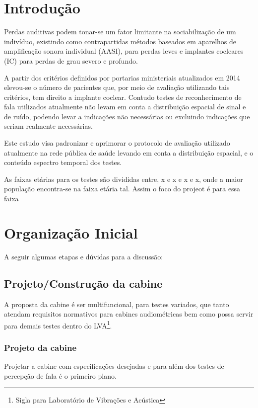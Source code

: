 \chapter{Introdução}

Perdas auditivas podem tonar-se um fator limitante na sociabilização de um indivíduo, existindo como contrapartidas métodos baseados em aparelhos de amplificação sonora individual (AASI), para perdas leves e implantes cocleares (IC) para perdas de grau severo e profundo.

A partir dos critérios definidos por portarias ministeriais atualizados em 2014 elevou-se o número de pacientes que, por meio de avaliação utilizando tais critérios, tem direito a implante coclear. Contudo testes de reconhecimento de fala utilizados atualmente não levam em conta a distribuição espacial de sinal e de ruído, podendo levar a indicações não necessárias ou excluindo indicações que seriam realmente necessárias.

Este estudo visa padronizar e aprimorar o protocolo de avaliação utilizado atualmente na rede pública de saúde levando em conta a distribuição espacial, e o conteúdo espectro temporal dos testes. 

As faixas etárias para os testes são divididas entre, x e x e x e x, onde a maior população encontra-se na faixa etária tal. Assim o foco do projeot é para essa faixa

\chapter{Organização Inicial}
A seguir algumas etapas e dúvidas para a discussão:

\section{Projeto/Construção da cabine}

A proposta da cabine é ser multifuncional, para testes variados, que tanto atendam requisitos normativos para cabines audiométricas bem como possa servir para demais testes dentro do LVA\footnote{Sigla para Laboratório de Vibrações e Acústica}.


\subsection{Projeto da cabine}
Projetar a cabine com especificações desejadas e para além dos testes de percepção de fala é o primeiro plano.

